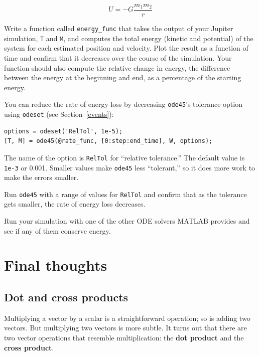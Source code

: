 \documentclass{book}
\begin{document}
\begin{equation}
U = -G \frac{m_1 m_2}{r}
\end{equation}

\begin{ex}
Write a function called {\tt energy\_func} that takes the output of
your Jupiter simulation, {\tt T} and {\tt M}, and computes the total
energy (kinetic and potential) of the system for each estimated
position and velocity.  Plot the result as a function of time and
confirm that it decreases over the course of the simulation.  Your
function should also compute the relative change in energy, the
difference between the energy at the beginning and end, as a
percentage of the starting energy.
\end{ex}

You can reduce the rate of energy loss by decreasing {\tt ode45}'s
tolerance option using {\tt odeset} (see Section~\ref{events}):

\begin{verbatim}
options = odeset('RelTol', 1e-5);
[T, M] = ode45(@rate_func, [0:step:end_time], W, options);
\end{verbatim}
%
The name of the option is {\tt RelTol} for ``relative tolerance.''
The default value is {\tt 1e-3} or 0.001.  Smaller values
make {\tt ode45} less ``tolerant,'' so it does more work to
make the errors smaller.

\begin{ex}
Run {\tt ode45} with a range of values for {\tt RelTol} and confirm
that as the tolerance gets smaller, the rate of energy loss
decreases.
\end{ex}

\begin{ex}
Run your simulation with one of the other ODE solvers MATLAB provides
and see if any of them conserve energy.
\end{ex}



\chapter{Final thoughts}

\section{Dot and cross products}

Multiplying a vector by a scalar is a straightforward operation;
so is adding two vectors.  But multiplying two vectors is more
subtle.  It turns out that there are two vector operations that
resemble multiplication: the {\bf dot product}
and the {\bf cross product}.
\end{document}
